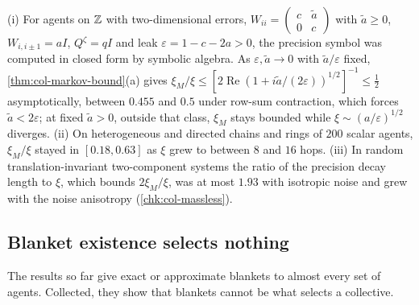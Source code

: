 \begin{observation}\label{obs:col-massless}
(i) For agents on $\mathbb{Z}$ with two-dimensional errors, $W_{ii}=\begin{pmatrix}c&\tilde a\\0&c\end{pmatrix}$ with $\tilde a\ge0$, $W_{i,i\pm1}=aI$, $Q^{\zeta}=qI$ and leak $\varepsilon=1-c-2a>0$, the precision symbol was computed in closed form by symbolic algebra. As $\varepsilon,\tilde a\to0$ with $\tilde a/\varepsilon$ fixed, \cref{thm:col-markov-bound}(a) gives $\xi_M/\xi\le[2\operatorname{Re}(1+i\tilde a/(2\varepsilon))^{1/2}]^{-1}\le\frac12$ asymptotically, between $0.455$ and $0.5$ under row-sum contraction, which forces $\tilde a<2\varepsilon$; at fixed $\tilde a>0$, outside that class, $\xi_M$ stays bounded while $\xi\sim(a/\varepsilon)^{1/2}$ diverges. (ii) On heterogeneous and directed chains and rings of $200$ scalar agents, $\xi_M/\xi$ stayed in $[0.18,0.63]$ as $\xi$ grew to between $8$ and $16$ hops. (iii) In random translation-invariant two-component systems the ratio of the precision decay length to $\xi$, which bounds $2\xi_M/\xi$, was at most $1.93$ with isotropic noise and grew with the noise anisotropy (\cref{chk:col-massless}).
\end{observation}

\subsection{Blanket existence selects nothing}\label{sec:col-selects}

The results so far give exact or approximate blankets to almost every set of agents. Collected, they show that blankets cannot be what selects a collective.

